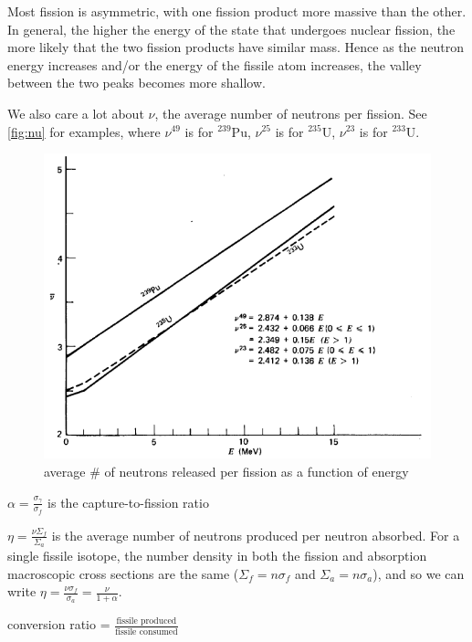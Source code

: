 \documentclass[12pt]{article}
\begin{document}
Most fission is asymmetric, with one fission product more massive than the other. In general, the higher the energy of the state that undergoes nuclear fission, the more likely that the two fission products have similar mass. Hence as the neutron energy increases and/or the energy of the fissile atom increases, the valley between the two peaks becomes more shallow.

We also care a lot about
$\nu$, the average number of neutrons per fission. See \autoref{fig:nu} for examples, where $\nu^{49}$ is for $^{239}$Pu, $\nu^{25}$ is for $^{235}$U, $\nu^{23}$ is for $^{233}$U.
\begin{figure}
\begin{center}
\includegraphics[scale=0.6]{../figs/nu}
\caption{average \# of neutrons released per fission as a function of energy}
\label{fig:nu}
\end{center}
\end{figure}


$\alpha = \frac{\sigma_\gamma}{\sigma_f}$ is the capture-to-fission ratio

$\eta = \frac{\nu \Sigma_f}{\Sigma_a}$ is the average number of neutrons produced per neutron absorbed. For a single fissile isotope, the number density in both the fission and absorption macroscopic cross sections are the same ($\Sigma_f = n\sigma_f$ and $\Sigma_a = n\sigma_a$), and so we can write $\eta = \frac{\nu \sigma_f}{\sigma_a} = \frac{\nu}{1+\alpha}.$

conversion ratio = $\frac{\text{fissile produced}}{\text{fissile consumed}}$
\end{document}
